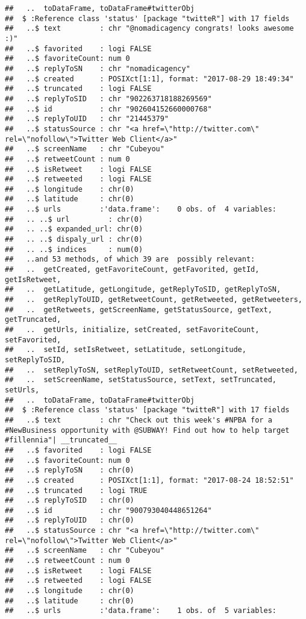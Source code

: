\documentclass[]{article}
\begin{document}
\begin{verbatim}
##   ..  toDataFrame, toDataFrame#twitterObj
##  $ :Reference class 'status' [package "twitteR"] with 17 fields
##   ..$ text         : chr "@nomadicagency congrats! looks awesome :)"
##   ..$ favorited    : logi FALSE
##   ..$ favoriteCount: num 0
##   ..$ replyToSN    : chr "nomadicagency"
##   ..$ created      : POSIXct[1:1], format: "2017-08-29 18:49:34"
##   ..$ truncated    : logi FALSE
##   ..$ replyToSID   : chr "902263718188269569"
##   ..$ id           : chr "902604152660000768"
##   ..$ replyToUID   : chr "21445379"
##   ..$ statusSource : chr "<a href=\"http://twitter.com\" rel=\"nofollow\">Twitter Web Client</a>"
##   ..$ screenName   : chr "Cubeyou"
##   ..$ retweetCount : num 0
##   ..$ isRetweet    : logi FALSE
##   ..$ retweeted    : logi FALSE
##   ..$ longitude    : chr(0) 
##   ..$ latitude     : chr(0) 
##   ..$ urls         :'data.frame':    0 obs. of  4 variables:
##   .. ..$ url         : chr(0) 
##   .. ..$ expanded_url: chr(0) 
##   .. ..$ dispaly_url : chr(0) 
##   .. ..$ indices     : num(0) 
##   ..and 53 methods, of which 39 are  possibly relevant:
##   ..  getCreated, getFavoriteCount, getFavorited, getId, getIsRetweet,
##   ..  getLatitude, getLongitude, getReplyToSID, getReplyToSN,
##   ..  getReplyToUID, getRetweetCount, getRetweeted, getRetweeters,
##   ..  getRetweets, getScreenName, getStatusSource, getText, getTruncated,
##   ..  getUrls, initialize, setCreated, setFavoriteCount, setFavorited,
##   ..  setId, setIsRetweet, setLatitude, setLongitude, setReplyToSID,
##   ..  setReplyToSN, setReplyToUID, setRetweetCount, setRetweeted,
##   ..  setScreenName, setStatusSource, setText, setTruncated, setUrls,
##   ..  toDataFrame, toDataFrame#twitterObj
##  $ :Reference class 'status' [package "twitteR"] with 17 fields
##   ..$ text         : chr "Check out this week's #NPBA for a #NewBusiness opportunity with @SUBWAY! Find out how to help target #fillennia"| __truncated__
##   ..$ favorited    : logi FALSE
##   ..$ favoriteCount: num 0
##   ..$ replyToSN    : chr(0) 
##   ..$ created      : POSIXct[1:1], format: "2017-08-24 18:52:51"
##   ..$ truncated    : logi TRUE
##   ..$ replyToSID   : chr(0) 
##   ..$ id           : chr "900793040448651264"
##   ..$ replyToUID   : chr(0) 
##   ..$ statusSource : chr "<a href=\"http://twitter.com\" rel=\"nofollow\">Twitter Web Client</a>"
##   ..$ screenName   : chr "Cubeyou"
##   ..$ retweetCount : num 0
##   ..$ isRetweet    : logi FALSE
##   ..$ retweeted    : logi FALSE
##   ..$ longitude    : chr(0) 
##   ..$ latitude     : chr(0) 
##   ..$ urls         :'data.frame':    1 obs. of  5 variables:

\end{verbatim}
\end{document}
